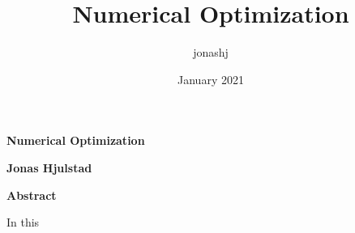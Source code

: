 \documentclass{article}
\title{Numerical Optimization}
\author{jonashj }
\date{January 2021}
\begin{document}
\thispagestyle{plain}
\begin{center}
    \Large
    \textbf{Numerical Optimization}
        
    \vspace{0.4cm}
    \large
        
    \vspace{0.4cm}
    \textbf{Jonas Hjulstad}
       
    \vspace{0.9cm}
    \textbf{Abstract}
\end{center}
In this 





\end{document}
